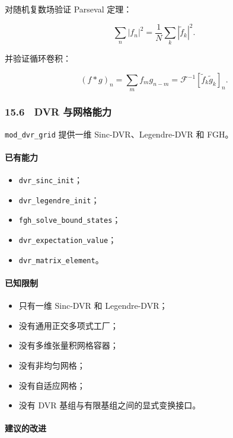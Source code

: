 \documentclass[
]{ctexbook}
\providecommand{\tightlist}{%
  \setlength{\itemsep}{0pt}\setlength{\parskip}{0pt}}
\begin{document}
对随机复数场验证 Parseval 定理：

\[
\sum_n |f_n|^2
=
\frac1N
\sum_k |\tilde f_k|^2.
\]

并验证循环卷积：

\[
(f*g)_n
=
\sum_m f_m g_{n-m}
=
\mathcal F^{-1}
\left[
\tilde f_k\tilde g_k
\right]_n.
\]

\hypertarget{dvr-ux4e0eux7f51ux683cux80fdux529b}{%
\subsubsection{15.6　DVR
与网格能力}\label{dvr-ux4e0eux7f51ux683cux80fdux529b}}

\texttt{mod\_dvr\_grid} 提供一维 Sinc-DVR、Legendre-DVR 和 FGH。

\hypertarget{ux5df2ux6709ux80fdux529b-4}{%
\paragraph{已有能力}\label{ux5df2ux6709ux80fdux529b-4}}

\begin{itemize}
\tightlist
\item
  \texttt{dvr\_sinc\_init}；
\item
  \texttt{dvr\_legendre\_init}；
\item
  \texttt{fgh\_solve\_bound\_states}；
\item
  \texttt{dvr\_expectation\_value}；
\item
  \texttt{dvr\_matrix\_element}。
\end{itemize}

\hypertarget{ux5df2ux77e5ux9650ux5236-4}{%
\paragraph{已知限制}\label{ux5df2ux77e5ux9650ux5236-4}}

\begin{itemize}
\tightlist
\item
  只有一维 Sinc-DVR 和 Legendre-DVR；
\item
  没有通用正交多项式工厂；
\item
  没有多维张量积网格容器；
\item
  没有非均匀网格；
\item
  没有自适应网格；
\item
  没有 DVR 基组与有限基组之间的显式变换接口。
\end{itemize}

\hypertarget{ux5efaux8baeux7684ux6539ux8fdb-3}{%
\paragraph{建议的改进}\label{ux5efaux8baeux7684ux6539ux8fdb-3}}
\end{document}
